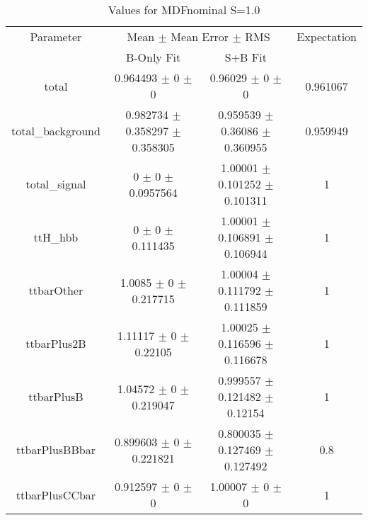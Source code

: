 \begin{table}
\centering
\caption{Values for MDFnominal S=1.0}
\begin{tabular}{cccc}
\toprule
Parameter & \multicolumn{2}{c}{Mean $\pm$ Mean Error $\pm$ RMS} & Expectation\\
 & B-Only Fit & S+B Fit & \\
\midrule
total & \num{0.964493} $\pm$ \num{0} $\pm$ \num{0} & \num{0.96029} $\pm$ \num{0} $\pm$ \num{0} & \num{0.961067}\\
total\_background & \num{0.982734} $\pm$ \num{0.358297} $\pm$ \num{0.358305} & \num{0.959539} $\pm$ \num{0.36086} $\pm$ \num{0.360955} & \num{0.959949}\\
total\_signal & \num{0} $\pm$ \num{0} $\pm$ \num{0.0957564} & \num{1.00001} $\pm$ \num{0.101252} $\pm$ \num{0.101311} & \num{1}\\
ttH\_hbb & \num{0} $\pm$ \num{0} $\pm$ \num{0.111435} & \num{1.00001} $\pm$ \num{0.106891} $\pm$ \num{0.106944} & \num{1}\\
ttbarOther & \num{1.0085} $\pm$ \num{0} $\pm$ \num{0.217715} & \num{1.00004} $\pm$ \num{0.111792} $\pm$ \num{0.111859} & \num{1}\\
ttbarPlus2B & \num{1.11117} $\pm$ \num{0} $\pm$ \num{0.22105} & \num{1.00025} $\pm$ \num{0.116596} $\pm$ \num{0.116678} & \num{1}\\
ttbarPlusB & \num{1.04572} $\pm$ \num{0} $\pm$ \num{0.219047} & \num{0.999557} $\pm$ \num{0.121482} $\pm$ \num{0.12154} & \num{1}\\
ttbarPlusBBbar & \num{0.899603} $\pm$ \num{0} $\pm$ \num{0.221821} & \num{0.800035} $\pm$ \num{0.127469} $\pm$ \num{0.127492} & \num{0.8}\\
ttbarPlusCCbar & \num{0.912597} $\pm$ \num{0} $\pm$ \num{0} & \num{1.00007} $\pm$ \num{0} $\pm$ \num{0} & \num{1}\\
\bottomrule
\end{tabular}
\end{table}